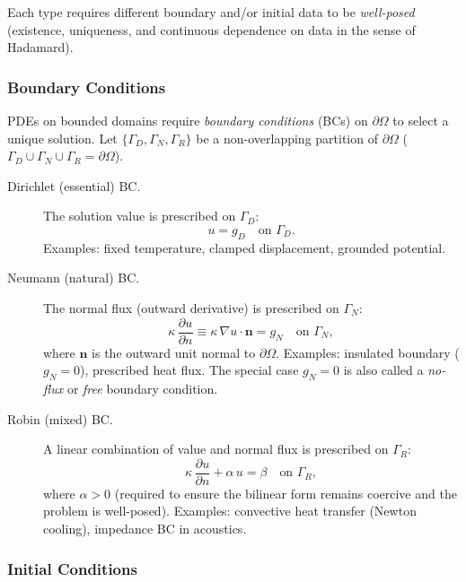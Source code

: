 \documentclass[11pt]{article}
\newcommand{\boundary}{\partial\Omega}
\begin{document}
Each type requires different boundary and/or initial data to be
\emph{well-posed} (existence, uniqueness, and continuous dependence on
data in the sense of Hadamard).

\subsubsection{Boundary Conditions}
\label{subsubsec:bcs}

PDEs on bounded domains require \emph{boundary conditions} (BCs) on
$\boundary$ to select a unique solution.
Let $\{\Gamma_D, \Gamma_N, \Gamma_R\}$ be a non-overlapping partition of
$\boundary$ ($\Gamma_D \cup \Gamma_N \cup \Gamma_R = \boundary$).

\begin{description}
  \item[Dirichlet (essential) BC.]
    The solution value is prescribed on $\Gamma_D$:
    \begin{equation*}
      u = g_D \quad \text{on } \Gamma_D.
    \end{equation*}
    Examples: fixed temperature, clamped displacement, grounded potential.

  \item[Neumann (natural) BC.]
    The normal flux (outward derivative) is prescribed on $\Gamma_N$:
    \begin{equation*}
      \kappa\,\frac{\partial u}{\partial n}
        \equiv \kappa\,\nabla u\cdot\mathbf{n} = g_N
        \quad \text{on } \Gamma_N,
    \end{equation*}
    where $\mathbf{n}$ is the outward unit normal to $\boundary$.
    Examples: insulated boundary ($g_N = 0$), prescribed heat flux.
    The special case $g_N = 0$ is also called a \emph{no-flux} or
    \emph{free} boundary condition.

  \item[Robin (mixed) BC.]
    A linear combination of value and normal flux is prescribed on
    $\Gamma_R$:
    \begin{equation*}
      \kappa\,\frac{\partial u}{\partial n} + \alpha\,u = \beta
      \quad \text{on } \Gamma_R,
    \end{equation*}
    where $\alpha > 0$ (required to ensure the bilinear form remains
    coercive and the problem is well-posed).
    Examples: convective heat transfer (Newton cooling), impedance BC in
    acoustics.
\end{description}

\subsubsection{Initial Conditions}
\end{document}
